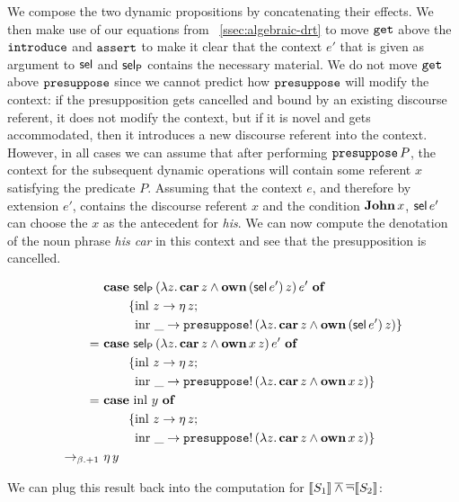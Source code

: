 We compose the two dynamic propositions by concatenating their effects. We
then make use of our equations from ~\ref{ssec:algebraic-drt} to move
$\mathtt{get}$ above the $\mathtt{introduce}$ and $\mathtt{assert}$ to make it clear
that the context $e'$ that is given as argument to $\textsf{sel}$ and $\textsf{sel}_{\textsf{P}}$
contains the necessary material. We do not move $\mathtt{get}$ above
$\mathtt{presuppose}$ since we cannot predict how $\mathtt{presuppose}$ will modify
the context: if the presupposition gets cancelled and bound by an existing
discourse referent, it does not modify the context, but if it is novel and
gets accommodated, then it introduces a new discourse referent into the
context. However, in all cases we can assume that after performing
$\mathtt{presuppose}\,P$, the context for the subsequent dynamic
operations will contain some referent $x$ satisfying the predicate
$P$. Assuming that the context $e$, and therefore by extension $e'$,
contains the discourse referent $x$ and the condition $\textbf{John}\,x$,
$\textsf{sel}\,e'$ can choose the $x$ as the antecedent for \emph{his}. We can
now compute the denotation of the noun phrase \emph{his car} in this
context and see that the presupposition is cancelled.

\begin{align*}
  &\text{\textbf{case} $\textsf{sel}_{\textsf{P}}\,(\lambda z.\, \textbf{car}\,z \land \textbf{own}\,(\textsf{sel}\,e')\,z)\,e'$ \textbf{of}} \\ &\qquad \{\operatorname{inl}\,z \to \eta\,z; \\ &\qquad \ \operatorname{inr}\,\_ \to \mathtt{presuppose}!\,(\lambda z.\, \textbf{car}\,z \land \textbf{own}\,(\textsf{sel}\,e')\,z) \} \\
=\ &\text{\textbf{case} $\textsf{sel}_{\textsf{P}}\,(\lambda z.\, \textbf{car}\,z \land \textbf{own}\,x\,z)\,e'$ \textbf{of}} \\ &\qquad \{\operatorname{inl}\,z \to \eta\,z; \\ &\qquad \ \operatorname{inr}\,\_ \to \mathtt{presuppose}!\,(\lambda z.\, \textbf{car}\,z \land \textbf{own}\,x\,z) \} \\
=\ &\text{\textbf{case} $\operatorname{inl}\,y$ \textbf{of}} \\ &\qquad \{\operatorname{inl}\,z \to \eta\,z; \\ &\qquad \ \operatorname{inr}\,\_ \to \mathtt{presuppose}!\,(\lambda z.\, \textbf{car}\,z \land \textbf{own}\,x\,z) \} \\
\to_{\beta.+1}\ &\eta\,y
\end{align*}

We can plug this result back into the computation for $\llbracket S_1 \rrbracket \mathbin{\overline{\land}}
\mathop{\overline{\lnot}} \llbracket S_2 \rrbracket$:

